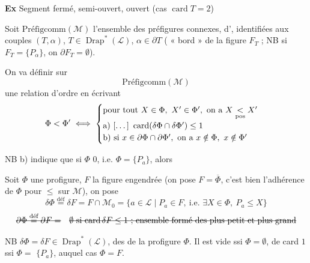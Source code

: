 \documentclass[11pt,a4paper]{article}
\begin{document}
\textbf{Ex} Segment fermé, semi-ouvert, ouvert (cas $\operatorname{card}T=2$)

Soit $\text{Préfigcomm}(\mathcal{M})$ l'ensemble des préfigures connexes,  \ill{} d', identifiées aux couples $(T,\alpha)$, $T\in\operatorname{Drap}^*(\mathcal{L})$, $\alpha\in\partial T$ ( « bord » de la figure  $F_T$ ; NB si $F_T=\{P_\alpha\}$, on  $\partial F_T=\emptyset$).


On va définir sur
\[ \text{Préfigcomm}(\mathcal{M}) \]
une relation d'ordre \struck{$<$} en écrivant
\[ \Phi < \Phi' \iff
\begin{cases}
\text{pour tout } X\in\Phi,\ X'\in\Phi',\ \text{on a } X \underset{\mathrm{pos}}{<} X' \\
\text{a) [\dots]}\ \operatorname{card}(\delta\Phi\cap\delta\Phi')\leq 1 \\
\text{b) si } x\in\partial\Phi\cap\partial\Phi',\ \text{on a } x\notin\Phi,\ x\notin\Phi'
\end{cases} \]

NB b) indique que si $\Phi$  $0$, i.e. $\Phi=\{P_a\}$, alors \ill{}

Soit $\Phi$ une profigure, $F$ la figure engendrée (on pose $F=\overline{\Phi}$, c'est bien l'adhérence de $\Phi$ pour $\leq$ sur $\mathcal{M}$), on pose
\[ \delta\Phi \overset{\text{déf}}{=} \delta F = F\cap\mathcal{M}_0
= \{a\in\mathcal{L} \mid P_a\in F,\ \text{i.e. } \exists X\in\Phi,\ P_a\leq X\} \]
\[ \text{\struck{$\partial\Phi \overset{\text{déf}}{=} \partial F =$}}\quad
\text{\struck{$\emptyset$ si $\operatorname{card}\delta F\leq 1$ ; ensemble formé des plus petit et plus grand}} \]

NB $\delta\Phi=\delta F\in\operatorname{Drap}^*(\mathcal{L})$,  des \struck{\ill{}}  de la profigure $\Phi$. Il est vide ssi $\Phi=\emptyset$, de card $1$ ssi $\Phi=$ \struck{\ill{}} $\{P_a\}$, auquel cas $\Phi=F$.

\end{document}
